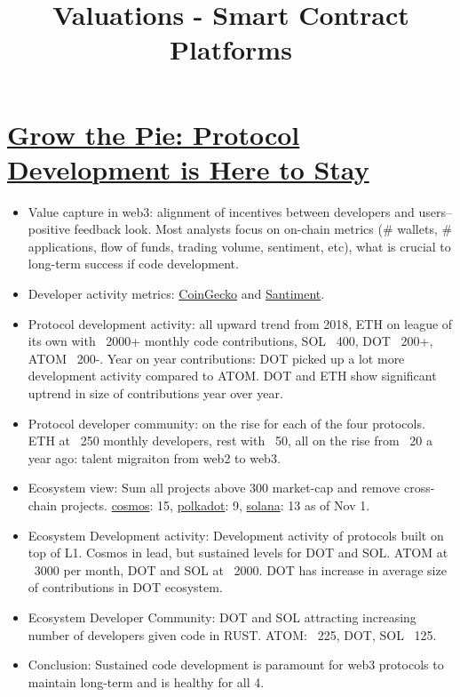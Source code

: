 \documentclass{../../notes}
\title{Valuations - Smart Contract Platforms}
\begin{document}
\maketitle

\section{\href{run:./grow-the-pie--protocol-development-is-here-to-stay.pdf}{Grow the Pie: Protocol Development is Here to Stay}}
\begin{itemize}
    \item Value capture in web3: alignment of incentives between developers and users--positive feedback look. Most analysts focus on on-chain metrics (\# wallets, \# applications, flow of funds, trading volume, sentiment, etc), what is crucial to long-term success if code development. 
    \item Developer activity metrics: \href{https://www.coingecko.com/en/coins/solana\#developer}{CoinGecko} and \href{https://academy.santiment.net/metrics/development-activity/}{Santiment}. 
    \item Protocol development activity: all upward trend from 2018, ETH on league of its own with ~2000+ monthly code contributions, SOL ~400, DOT ~200+, ATOM ~200-. Year on year contributions: DOT picked up a lot more development activity compared to ATOM. DOT and ETH show significant uptrend in size of contributions year over year. 
    \item Protocol developer community: on the rise for each of the four protocols. ETH at ~250 monthly developers, rest with ~50, all on the rise from ~20 a year ago: talent migraiton from web2 to web3. 
    \item Ecosystem view: Sum all projects above 300 market-cap and remove cross-chain projects. \href{https://www.coingecko.com/en/categories/cosmos-ecosystem}{cosmos}: 15, \href{https://www.coingecko.com/en/categories/dot-ecosystem}{polkadot}: 9, \href{https://www.coingecko.com/en/categories/solana-ecosystem}{solana}: 13 as of Nov 1. 

    \item Ecosystem Development activity: Development activity of protocols built on top of L1. Cosmos in lead, but sustained levels for DOT and SOL. ATOM at ~3000 per month, DOT and SOL at ~2000. DOT has increase in average size of contributions in DOT ecosystem. 
    \item Ecosystem Developer Community: DOT and SOL attracting increasing number of developers given code in RUST. ATOM: ~225, DOT, SOL ~125. 
    \item Conclusion: Sustained code development is paramount for web3 protocols to maintain long-term and is healthy for all 4. 
\end{itemize}
\end{document}
